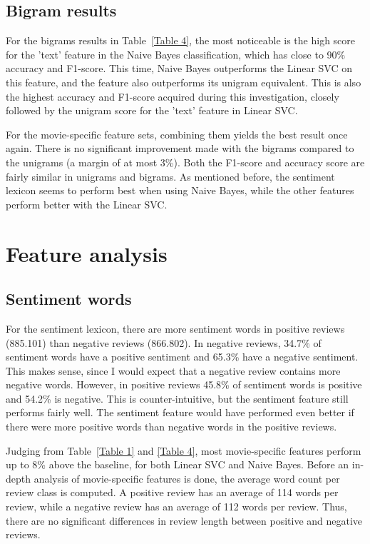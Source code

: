 \documentclass[
10pt, %
a4paper, %
oneside, %
headinclude,footinclude, %
] {book}%
\begin{document}
\subsection{Bigram results}

For the bigrams results in Table~\ref{Table 4}, the most noticeable is the high score for the 'text' feature in the Naive Bayes classification, which has close to 90\% accuracy and F1-score. This time, Naive Bayes outperforms the Linear SVC on this feature, and the feature also outperforms its unigram equivalent. This is also the highest accuracy and F1-score acquired during this investigation, closely followed by the unigram score for the 'text' feature in Linear SVC. 

For the movie-specific feature sets, combining them yields the best result once again. There is no significant improvement made with the bigrams compared to the unigrams (a margin of at most 3\%). Both the F1-score and accuracy score are fairly similar in unigrams and bigrams. As mentioned before, the sentiment lexicon seems to perform best when using Naive Bayes, while the other features perform better with the Linear SVC.

\section{Feature analysis}

\subsection{Sentiment words}

For the sentiment lexicon, there are more sentiment words in positive reviews (885.101) than negative reviews (866.802). In negative reviews, 34.7\% of sentiment words have a positive sentiment and 65.3\% have a negative sentiment. This makes sense, since I would expect  that a negative review contains more negative words. However, in positive reviews 45.8\% of sentiment words is positive and 54.2\% is negative. This is counter-intuitive, but the sentiment feature still performs fairly well. The sentiment feature would have performed even better if there were more positive words than negative words in the positive reviews.

Judging from Table~\ref{Table 1} and \ref{Table 4}, most movie-specific features perform up to 8\% above the baseline, for both Linear SVC and Naive Bayes. Before an in-depth analysis of movie-specific features is done, the average word count per review class is computed. A positive review has an average of 114 words per review, while a negative review has an average of 112 words per review. Thus, there are no significant differences in review length between positive and negative reviews.
\end{document}
